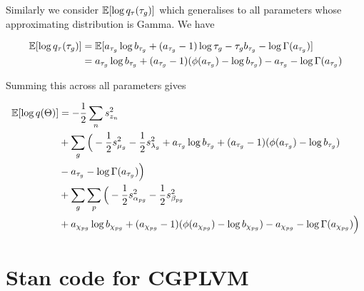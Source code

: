 Similarly we consider $\mathbb{E}[\log q_\tau(\tau_g)]$ which generalises to all parameters whose approximating distribution is Gamma. We have

\begin{equation}
\begin{aligned}
\mathbb{E}[\log q_\tau(\tau_g)] & 
= \mathbb{E}[a_{\tau_g} \log b_{\tau_g} + (a_{\tau_g} - 1) \log \tau_g - \tau_g b_{\tau_g} -\log \Gamma(a_{\tau_g})] \\
& = a_{\tau_g} \log b_{\tau_g} + (a_{\tau_g} - 1)(\phi(a_{\tau_g}) - \log b_{\tau_g}) - a_{\tau_g} - \log \Gamma(a_{\tau_g})
\end{aligned}
\end{equation}


Summing this across all parameters gives

\begin{equation}
\begin{aligned}
\mathbb{E}[\log q(\Theta)] &= -\frac{1}{2} \sum_n s_{z_n}^2 \\
& + \sum_g \Big(- \frac{1}{2} s_{\mu_g}^2 - \frac{1}{2} s_{\lambda_g}^2 +
a_{\tau_g} \log b_{\tau_g} + (a_{\tau_g} - 1)(\phi(a_{\tau_g}) - \log b_{\tau_g})  \\
& - a_{\tau_g} - \log \Gamma(a_{\tau_g}) \Big) \\
& + \sum_g \sum_p \Big(
-\frac{1}{2} s_{\alpha_{pg}}^2 - \frac{1}{2} s_{\beta_{pg}}^2 \\
& + a_{\chi_{pg}} \log b_{\chi_{pg}} + (a_{\chi_{pg}} - 1)(\phi(a_{\chi_{pg}}) - \log b_{\chi_{pg}}) - a_{\chi_{pg}} - \log \Gamma(a_{\chi_{pg}})\Big)
\end{aligned}
\end{equation}


\section{Stan code for CGPLVM}

